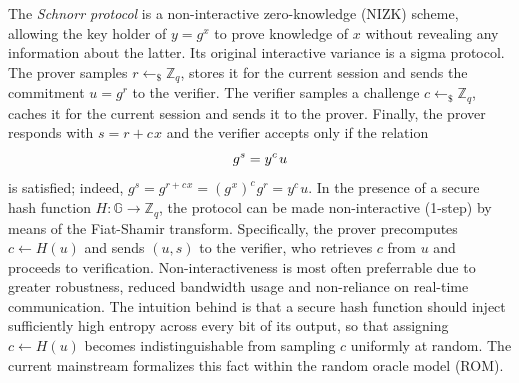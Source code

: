 \documentclass{iacrtrans}
\begin{document}
The \textit{Schnorr protocol}
is a non-interactive zero-knowledge (NIZK) scheme,
allowing the key holder of $y = g ^ x$
to prove knowledge of $x$
without revealing any information about the latter.
Its original interactive variance \cite{paper_schnorr} is a sigma protocol.
The prover samples $r \leftarrow_\$ \mathbb{Z}_q$,
stores it for the current session
and sends the commitment $u = g ^ r$ to the verifier.
The verifier samples a challenge $c \leftarrow_\$ \mathbb{Z}_q$,
caches it for the current session and sends it to the prover.
Finally, the prover responds with $s = r + c\hspace{1pt}x$
and the verifier accepts only if the relation
\vspace{5pt}
\begin{equation*}
g ^ s = y ^ c\hspace{1pt}u
\vspace{5pt}
\end{equation*}
is satisfied; indeed,
$g^s=g^{r + c\hspace{1pt}x}
=(g^{\hspace{1pt}x})^c\hspace{1pt}g^r
=y^c\hspace{1pt}u$.
In the presence of a secure hash function
$H: \mathbb{G} \rightarrow \mathbb{Z}_q$,
the protocol can be made non-interactive (1-step)
by means of the Fiat-Shamir transform. Specifically,
the prover precomputes $c \leftarrow H(u)$
and sends $(u, s)$ to the verifier,
who retrieves $c$ from $u$ and proceeds
to verification.
Non-interactiveness is most often preferrable
due to greater robustness, reduced bandwidth usage
and non-reliance on real-time communication.
The intuition behind is that a secure hash function
should inject sufficiently high entropy
across every bit of its output,
so that assigning $c \leftarrow H(u)$
becomes indistinguishable from sampling $c$ uniformly at random.
The current mainstream formalizes this fact
within the random oracle model (ROM).
\end{document}

